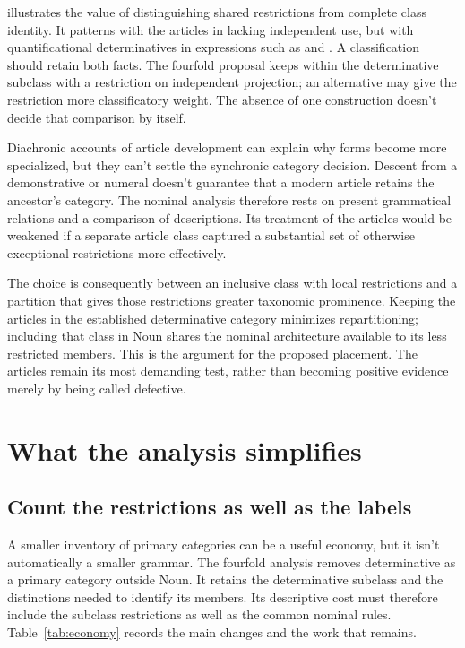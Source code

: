 \documentclass[12pt]{article}
\begin{document}
 illustrates the value of distinguishing shared restrictions from complete class identity. It patterns with the articles in lacking independent use, but with quantificational determinatives in expressions such as  and . A classification should retain both facts. The fourfold proposal keeps  within the determinative subclass with a restriction on independent projection; an alternative may give the restriction more classificatory weight. The absence of one construction doesn't decide that comparison by itself.

Diachronic accounts of article development can explain why forms become more specialized, but they can't settle the synchronic category decision. Descent from a demonstrative or numeral doesn't guarantee that a modern article retains the ancestor's category. The nominal analysis therefore rests on present grammatical relations and a comparison of descriptions. Its treatment of the articles would be weakened if a separate article class captured a substantial set of otherwise exceptional restrictions more effectively.

The choice is consequently between an inclusive class with local restrictions and a partition that gives those restrictions greater taxonomic prominence. Keeping the articles in the established determinative category minimizes repartitioning; including that class in Noun shares the nominal architecture available to its less restricted members. This is the argument for the proposed placement. The articles remain its most demanding test, rather than becoming positive evidence merely by being called defective.

\section{What the analysis simplifies}\label{sec:economy}

\subsection{Count the restrictions as well as the labels}

A smaller inventory of primary categories can be a useful economy, but it isn't automatically a smaller grammar. The fourfold analysis removes determinative as a primary category outside Noun. It retains the determinative subclass and the distinctions needed to identify its members. Its descriptive cost must therefore include the subclass restrictions as well as the common nominal rules. Table~\ref{tab:economy} records the main changes and the work that remains.
\end{document}
